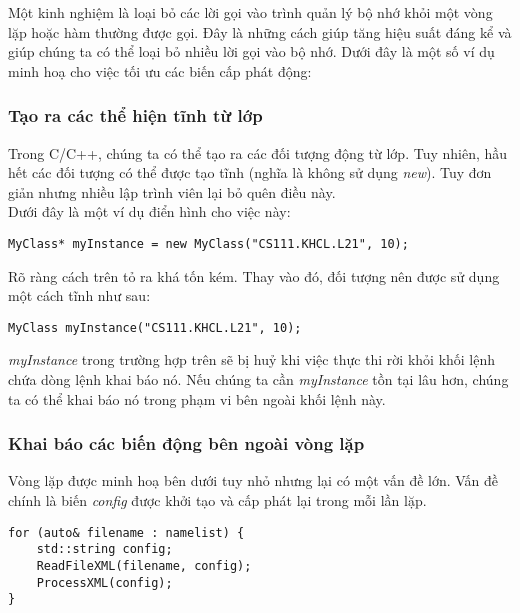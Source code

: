\documentclass{article}
\begin{document}
Một kinh nghiệm là loại bỏ các lời gọi vào trình quản lý bộ nhớ khỏi một vòng lặp hoặc hàm thường được gọi. Đây là những cách giúp tăng hiệu suất đáng kể và giúp chúng ta có thể loại bỏ nhiều lời gọi vào bộ nhớ. Dưới đây là một số ví dụ minh hoạ cho việc tối ưu các biến cấp phát động:

\subsubsection{Tạo ra các thể hiện tĩnh từ lớp}
Trong C/C++, chúng ta có thể tạo ra các đối tượng động từ lớp. Tuy nhiên, hầu hết các đối tượng có thể được tạo tĩnh (nghĩa là không sử dụng \textit{new}). Tuy đơn giản nhưng nhiều lập trình viên lại bỏ quên điều này.\\

Dưới đây là một ví dụ điển hình cho việc này:\\

\begin{verbatim}
MyClass* myInstance = new MyClass("CS111.KHCL.L21", 10);
\end{verbatim}

Rõ ràng cách trên tỏ ra khá tốn kém. Thay vào đó, đối tượng nên được sử dụng một cách tĩnh như sau:\\

\begin{verbatim}
MyClass myInstance("CS111.KHCL.L21", 10);
\end{verbatim}

\textit{myInstance} trong trường hợp trên sẽ bị huỷ khi việc thực thi rời khỏi khối lệnh chứa dòng lệnh khai báo nó. Nếu chúng ta cần \textit{myInstance} tồn tại lâu hơn, chúng ta có thể khai báo nó trong phạm vi bên ngoài khối lệnh này. 

\subsubsection{Khai báo các biến động bên ngoài vòng lặp}
Vòng lặp được minh hoạ bên dưới tuy nhỏ nhưng lại có một vấn đề lớn. Vấn đề chính là biến \textit{config} được khởi tạo và cấp phát lại trong mỗi lần lặp.\\

\begin{verbatim}
for (auto& filename : namelist) {
    std::string config;
    ReadFileXML(filename, config);
    ProcessXML(config);
}
\end{verbatim}
\end{document}
